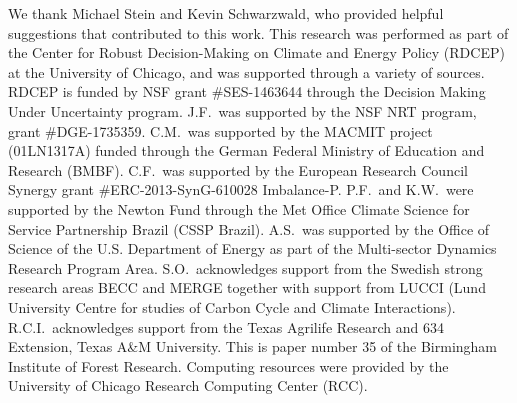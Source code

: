 \documentclass[gmd, manuscript]{copernicus} %
\begin{document}
\noappendix %



\begin{acknowledgements}
We thank Michael Stein and Kevin Schwarzwald, who provided helpful suggestions that contributed to this work. This research was performed as part of the Center for Robust Decision-Making on Climate and Energy Policy (RDCEP) at the University of Chicago, and was supported through a variety of sources. RDCEP is funded by NSF grant \#SES-1463644 through the Decision Making Under Uncertainty program. J.F.\ was supported by the NSF NRT program, grant \#DGE-1735359. C.M.\ was supported by the MACMIT project (01LN1317A) funded through the German Federal Ministry of Education and Research (BMBF). C.F.\ was supported by the European Research Council Synergy grant \#ERC-2013-SynG-610028 Imbalance-P. P.F.\ and K.W.\ were supported  by the Newton Fund through the Met Office Climate Science for Service Partnership Brazil (CSSP Brazil). A.S.\ was supported by the Office of Science of the U.S. Department of Energy as part of the Multi-sector Dynamics Research Program Area. S.O.\ acknowledges support from the Swedish strong research areas BECC and MERGE together with support from LUCCI (Lund University Centre for studies of Carbon Cycle and Climate Interactions). R.C.I.\ acknowledges support from the Texas Agrilife Research and 634 Extension, Texas A&M University. This is paper number 35 of the Birmingham Institute of Forest Research. Computing resources were provided by the University of Chicago Research Computing Center (RCC).
\end{acknowledgements}



\end{document}
